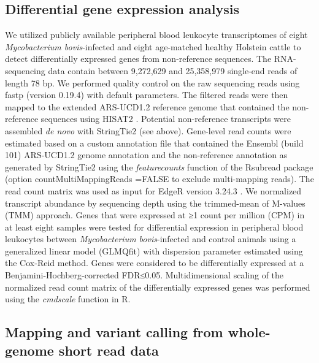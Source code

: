 \documentclass[../main.tex]{subfiles}
\begin{document}
\subsection*{Differential gene expression analysis}

We utilized publicly available peripheral blood leukocyte transcriptomes of eight \emph{Mycobacterium bovis}-infected and eight age-matched healthy Holstein cattle \citep{mcloughlin2014rna} to detect differentially expressed genes from non-reference sequences. The RNA-sequencing data contain between 9,272,629 and 25,358,979 single-end reads of length 78 bp. We performed quality control on the raw sequencing reads using fastp (version 0.19.4) \citep{chen2018fastp} with default parameters. The filtered reads were then mapped to the extended ARS-UCD1.2 reference genome that contained the non-reference sequences using HISAT2 \citep{kim2019graph}. Potential non-reference transcripts were assembled \emph{de novo} with StringTie2 (see above). Gene-level read counts were estimated based on a custom annotation file that contained the Ensembl (build 101) ARS-UCD1.2 genome annotation and the non-reference annotation as generated by StringTie2 using the \emph{featurecounts} function of the Rsubread package (option countMultiMappingReads =FALSE to exclude multi-mapping reads). The read count matrix was used as input for EdgeR version 3.24.3 \citep{robinson2010edger}. We normalized transcript abundance by sequencing depth using the trimmed-mean of M-values (TMM) approach. Genes that were expressed at ≥1 count per million (CPM) in at least eight samples were tested for differential expression in peripheral blood leukocytes between \emph{Mycobacterium bovis}-infected and control animals using a generalized linear model (GLMQfit) with dispersion parameter estimated using the Cox-Reid method. Genes were considered to be differentially expressed at a Benjamini-Hochberg-corrected FDR≤0.05. Multidimensional scaling of the normalized read count matrix of the differentially expressed genes was performed using the \emph{cmdscale} function in R.

\subsection*{Mapping and variant calling from whole-genome short read data}
\end{document}
